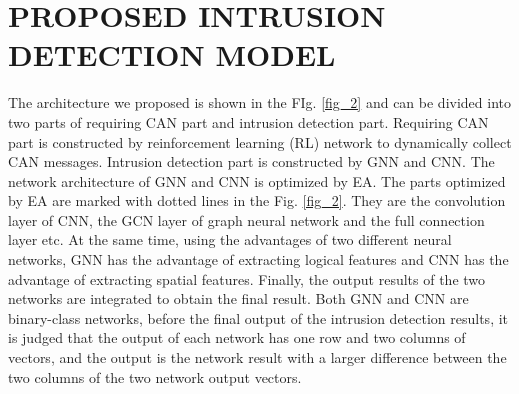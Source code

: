 \documentclass[lettersize,journal]{IEEEtran}
\begin{document}
\section{PROPOSED INTRUSION DETECTION MODEL}\label{section_proposed}
The architecture we proposed is shown in the FIg. \ref{fig_2} and can be divided into two parts of requiring CAN part and intrusion detection part. Requiring CAN part is constructed by reinforcement learning (RL) network to dynamically collect CAN messages. Intrusion detection part is constructed by GNN and CNN. The network architecture of GNN and CNN is optimized by EA. The parts optimized by EA are marked with dotted lines in the Fig. \ref{fig_2}. They are the convolution layer of CNN, the GCN layer of graph neural network and the full connection layer etc. At the same time, using the advantages of two different neural networks, GNN has the advantage of extracting logical features and CNN has the advantage of extracting spatial features. Finally, the output results of the two networks are integrated to obtain the final result. Both GNN and CNN are binary-class networks, before the final output of the intrusion detection results, it is judged that the output of each network has one row and two columns of vectors, and the output is the network result with a larger difference between the two columns of the two network output vectors.
\end{document}
